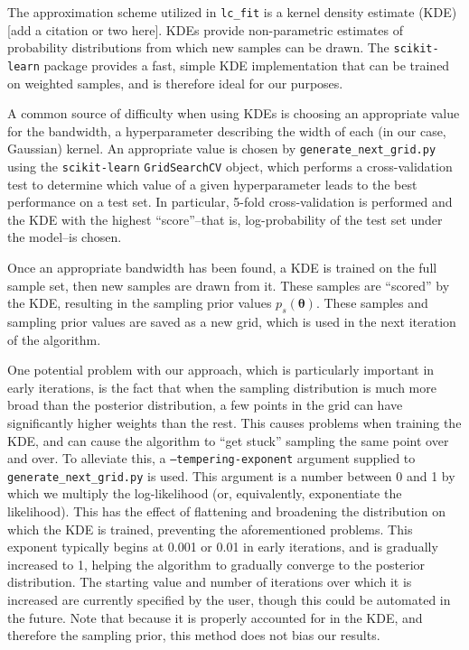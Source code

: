 \documentclass[11pt]{article}
\newcommand\editremark[1]{{\color{red}#1}}
\begin{document}
The approximation scheme utilized in \texttt{lc\_fit} is a kernel density estimate (KDE) \editremark{[add a citation or two here]}. KDEs provide non-parametric estimates of probability distributions from which new samples can be drawn. The \texttt{scikit-learn} package provides a fast, simple KDE implementation that can be trained on weighted samples, and is therefore ideal for our purposes.

A common source of difficulty when using KDEs is choosing an appropriate value for the bandwidth, a hyperparameter describing the width of each (in our case, Gaussian) kernel. An appropriate value is chosen by \texttt{generate\_next\_grid.py} using the \texttt{scikit-learn} \texttt{GridSearchCV} object, which performs a cross-validation test to determine which value of a given hyperparameter leads to the best performance on a test set. In particular, 5-fold cross-validation is performed and the KDE with the highest ``score''--that is, log-probability of the test set under the model--is chosen.

Once an appropriate bandwidth has been found, a KDE is trained on the full sample set, then new samples are drawn from it. These samples are ``scored'' by the KDE, resulting in the sampling prior values $p_s(\bm{\theta})$. These samples and sampling prior values are saved as a new grid, which is used in the next iteration of the algorithm.

One potential problem with our approach, which is particularly important in early iterations, is the fact that when the sampling distribution is much more broad than the posterior distribution, a few points in the grid can have significantly higher weights than the rest. This causes problems when training the KDE, and can cause the algorithm to ``get stuck'' sampling the same point over and over. To alleviate this, a \texttt{--tempering-exponent} argument supplied to \texttt{generate\_next\_grid.py} is used. This argument is a number between 0 and 1 by which we multiply the log-likelihood (or, equivalently, exponentiate the likelihood). This has the effect of flattening and broadening the distribution on which the KDE is trained, preventing the aforementioned problems. This exponent typically begins at 0.001 or 0.01 in early iterations, and is gradually increased to 1, helping the algorithm to gradually converge to the posterior distribution. The starting value and number of iterations over which it is increased are currently specified by the user, though this could be automated in the future. Note that because it is properly accounted for in the KDE, and therefore the sampling prior, this method does not bias our results.
\end{document}
